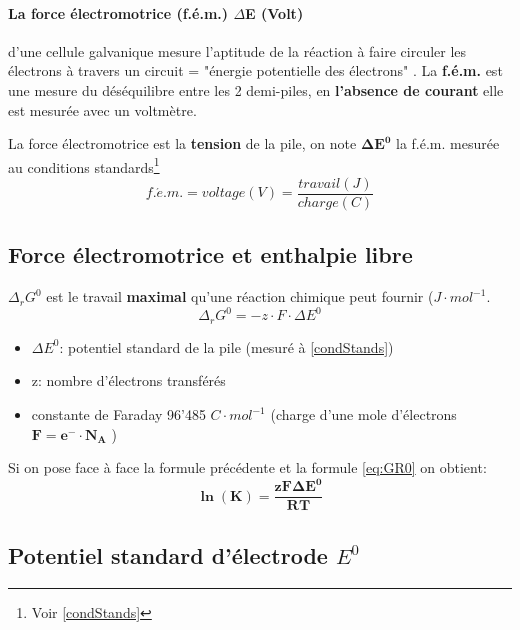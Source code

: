 \documentclass[10pt,a4paper]{book}
\begin{document}
\paragraph{La force électromotrice (\textbf{f.é.m.}) $\Delta$E (Volt)} d'une cellule galvanique mesure l'aptitude de la réaction à faire circuler les électrons à travers un circuit = "énergie potentielle des électrons" . La \textbf{f.é.m.} est une mesure du déséquilibre entre les 2 demi-piles, en \textbf{l'absence de courant} elle est mesurée avec un voltmètre. \par
La force électromotrice est la \textbf{tension} de la pile, on note $\mathbf{\Delta E^0}$ la f.é.m. mesurée au conditions standards\footnote{Voir \ref{condStands}}
\begin{displaymath}
f.\acute{e}.m. = voltage (V) = \frac{travail (J)}{charge (C)}
\end{displaymath}

\subsection{Force électromotrice et enthalpie libre}

$\Delta_rG^0$ est le travail \textbf{maximal} qu'une réaction chimique peut fournir ($J\cdot mol^{-1}$.
\begin{displaymath}
\Delta_rG^0 = -z\cdot F \cdot \Delta E^0
\end{displaymath}
\begin{itemize}
\item $\Delta E^0$: potentiel standard de la pile (mesuré à \ref{condStands})
\item z: nombre d'électrons transférés
\item constante de Faraday 96'485 $C\cdot mol^{-1}$ (charge d’une mole d'électrons \(\mathbf{F = e^- \cdot N_A}\) \label{cte:Faraday})
\end{itemize}
Si on pose face à face la formule précédente et la formule \ref{eq:GR0} on obtient:
\begin{displaymath}
\mathbf{\ln (K) = \frac{zF \Delta E^0}{RT}}
\end{displaymath}

\subsection{Potentiel standard d'électrode \texorpdfstring{$E^0$}{E0}}
\end{document}
